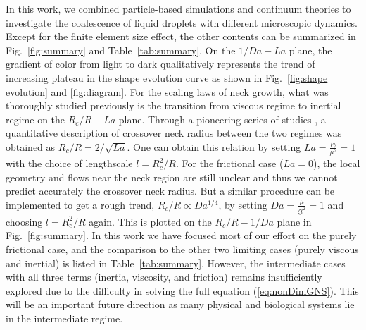\documentclass[%
reprint,
amsmath,amssymb,
aps,
]{revtex4-2}
\begin{document}
	In this work, we combined particle-based simulations and continuum theories to investigate the coalescence of liquid droplets with different microscopic dynamics. Except for the finite element size effect, the other contents can be summarized in Fig.~\ref{fig:summary} and Table~\ref{tab:summary}. On the $1/Da-La$ plane, the gradient of color from light to dark qualitatively represents the trend of increasing plateau in the shape evolution curve as shown in Fig.~\ref{fig:shape evolution} and \ref{fig:diagram}. For the scaling laws of neck growth, what was thoroughly studied previously is the transition from viscous regime to inertial regime on the $R_c/R-La$ plane. Through a pioneering series of studies \cite{eggersCoalescenceLiquidDrops1999a,paulsenViscousInertialCrossover2011,xia2019universality}, a quantitative description of crossover neck radius between the two regimes was obtained as $R_c/R = 2/\sqrt{La}$. One can obtain this relation by setting $La = \frac{ l\gamma}{\mu^2}=1$ with the choice of lengthscale $l=R_c^2/R$. For the frictional case ($La=0$), the local geometry and flows near the neck region are still unclear and thus we cannot predict accurately the crossover neck radius. But a similar procedure can be implemented to get a rough trend, $R_c/R \propto Da^{1/4}$, by setting $Da=\frac{\mu}{\zeta l^2}=1$ and choosing $l=R_c^2/R$ again. This is plotted on the $R_c/R-1/Da$ plane in Fig.~\ref{fig:summary}. In this work we have focused most of our effort on the purely frictional case, and the comparison to the other two limiting cases (purely viscous and inertial) is listed in Table~\ref{tab:summary}. However, the intermediate cases with all three terms (inertia, viscosity, and friction) remains insufficiently explored due to the difficulty in solving the full equation (\ref{eq:nonDimGNS}). This will be an important future direction as many physical and biological systems lie in the intermediate regime.   
\end{document}
